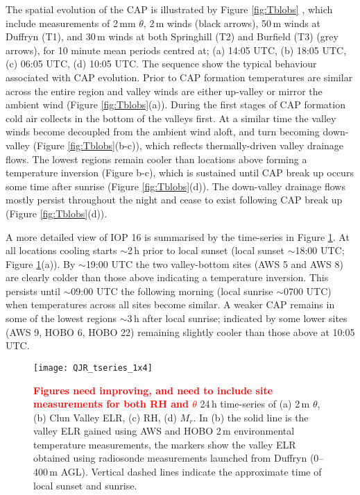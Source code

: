 \documentclass[times]{qjrms4}
\begin{document}
The spatial evolution of the CAP is illustrated by Figure \ref{fig:Tblobs} , which include measurements of 2$\,\mbox{m}$m $\theta$, 2$\,\mbox{m}$ winds (black arrows), 50$\,\mbox{m}$ winds at Duffryn (T1), and 30$\,\mbox{m}$ winds at both Springhill (T2) and Burfield (T3) (grey arrows), for 10 minute mean periods centred at; (a) 14:05 UTC, (b) 18:05 UTC, (c) 06:05 UTC, (d) 10:05 UTC. The sequence show the typical behaviour associated with CAP evolution. Prior to CAP formation temperatures are similar across the entire region and valley winds are either up-valley or mirror the ambient wind (Figure \ref{fig:Tblobs}(a)). During the first stages of CAP formation cold air collects in the bottom of the valleys first. At a similar time the valley winds become decoupled from the ambient wind aloft, and turn becoming down-valley (Figure \ref{fig:Tblobs}(b-c)), which reflects thermally-driven valley drainage flows. The lowest regions remain cooler than locations above forming a temperature inversion (Figure b-c), which is sustained until CAP break up occurs some time after sunrise (Figure \ref{fig:Tblobs}(d)). The down-valley drainage flows mostly persist throughout the night and cease to exist following CAP break up (Figure \ref{fig:Tblobs}(d)).

A more detailed view of IOP 16 is summarised by the time-series in Figure \ref{fig:tseries}. At all locations cooling starts $\sim$2$\,\mbox{h}$ prior to local sunset (local sunset $\sim$18:00 UTC; Figure \ref{fig:tseries}(a)). By $\sim$19:00 UTC the two valley-bottom sites (AWS 5 and AWS 8) are clearly colder than those above indicating a temperature inversion. This persists until $\sim$09:00 UTC the following morning (local sunrise $\sim$0700 UTC) when temperatures across all sites become similar. A weaker CAP remains in some of the lowest regions $\sim$3$\,\mbox{h}$ after local sunrise; indicated by some lower sites (AWS 9, HOBO 6, HOBO 22) remaining slightly cooler than those above at 10:05 UTC.
%
        \begin{figure}
        \centering
        \texttt{[image: QJR\_tseries\_1x4]}
        \caption{\textcolor{red}{\bf Figures need improving, and need to include site measurements for both RH and $\theta$} 24$\,\mbox{h}$ time-series of (a) 2$\,\mbox{m}$ $\theta$, (b) Clun Valley ELR, (c) RH, (d) $M_r$. In (b) the solid line is the valley ELR gained using AWS and HOBO 2$\,\mbox{m}$ environmental temperature measurements, the markers show the valley ELR obtained using radiosonde measurements launched from Duffryn (0--400$\,\mbox{m}$ AGL). Vertical dashed lines indicate the approximate time of local sunset and sunrise.}
        \label{fig:tseries}
        \end{figure}
\end{document}
